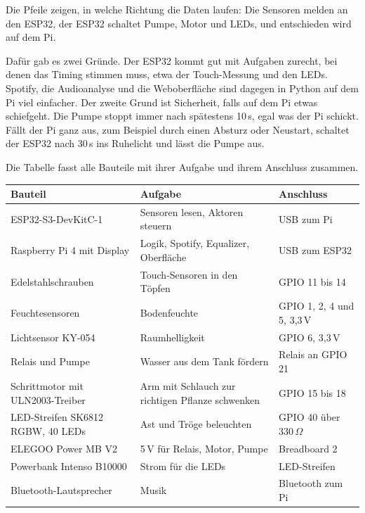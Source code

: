 \documentclass[11pt,a4paper]{article}
\begin{document}
Die Pfeile zeigen, in welche Richtung die Daten laufen: Die Sensoren melden an den ESP32, der ESP32 schaltet Pumpe, Motor und LEDs, und entschieden wird auf dem Pi.

Dafür gab es zwei Gründe. Der ESP32 kommt gut mit Aufgaben zurecht, bei denen das Timing stimmen muss, etwa der Touch-Messung und den LEDs. Spotify, die Audioanalyse und die Weboberfläche sind dagegen in Python auf dem Pi viel einfacher. Der zweite Grund ist Sicherheit, falls auf dem Pi etwas schiefgeht. Die Pumpe stoppt immer nach spätestens 10\,s, egal was der Pi schickt. Fällt der Pi ganz aus, zum Beispiel durch einen Absturz oder Neustart, schaltet der ESP32 nach 30\,s ins Ruhelicht und lässt die Pumpe aus.

Die Tabelle fasst alle Bauteile mit ihrer Aufgabe und ihrem Anschluss zusammen.

\begin{table}[H]
\centering
\small
\begin{tabularx}{\linewidth}{>{\raggedright\arraybackslash}p{4.4cm}L>{\raggedright\arraybackslash}p{4.2cm}}
\toprule
\textbf{Bauteil} & \textbf{Aufgabe} & \textbf{Anschluss} \\
\midrule
ESP32-S3-DevKitC-1 & Sensoren lesen, Aktoren steuern & USB zum Pi \\
Raspberry Pi 4 mit Display & Logik, Spotify, Equalizer, Oberfläche & USB zum ESP32 \\
4 Edelstahlschrauben & Touch-Sensoren in den Töpfen & GPIO 11 bis 14 \\
4 Feuchtesensoren & Bodenfeuchte & GPIO 1, 2, 4 und 5, 3,3\,V \\
Lichtsensor KY-054 & Raumhelligkeit & GPIO 6, 3,3\,V \\
Relais und Pumpe & Wasser aus dem Tank fördern & Relais an GPIO 21 \\
Schrittmotor mit ULN2003-Treiber & Arm mit Schlauch zur richtigen Pflanze schwenken & GPIO 15 bis 18 \\
LED-Streifen SK6812 RGBW, 40 LEDs & Ast und Tröge beleuchten & GPIO 40 über 330\,$\Omega$ \\
ELEGOO Power MB V2 & 5\,V für Relais, Motor, Pumpe & Breadboard 2 \\
Powerbank Intenso B10000 & Strom für die LEDs & LED-Streifen \\
Bluetooth-Lautsprecher & Musik & Bluetooth zum Pi \\
\bottomrule
\end{tabularx}
\end{table}
\end{document}

